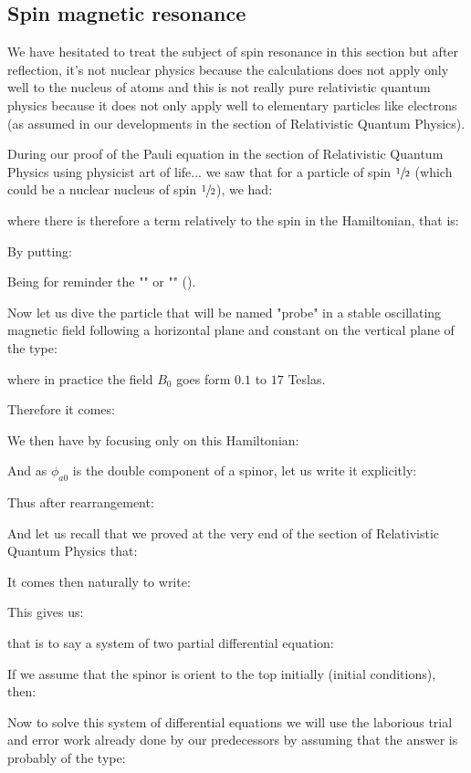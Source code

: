 	\pagebreak
	\subsection{Spin magnetic resonance}
	We have hesitated to treat the subject of spin resonance in this section but after reflection, it's not nuclear physics because the calculations does not apply only well to the nucleus of atoms and this is not really pure relativistic quantum physics because it does not only apply well to elementary particles like electrons (as assumed in our developments in the section  of Relativistic Quantum Physics).

	During our proof of the Pauli equation in the section of Relativistic Quantum Physics using physicist art of life... we saw that for a particle of spin $\sfrac{1}{2}$ (which could be a nuclear nucleus of spin $\sfrac{1}{2}$), we had:
	
	where there is therefore a term relatively to the spin in the Hamiltonian, that is:
	
	By putting:
	
	Being for reminder the "" or "" ().
	
	Now let us dive the particle that will be named "probe" in a stable oscillating magnetic field following a horizontal plane and constant on the vertical plane of the type:
	
	where in practice the field $B_0$ goes form $0.1$ to $17$ Teslas.

	Therefore it comes:
	
	We then have by focusing only on this Hamiltonian:
	
	And as $\phi_{a0}$ is the double component of a spinor, let us write it explicitly:
	
	Thus after rearrangement:
	
	And let us recall that we proved at the very end of the section of Relativistic Quantum Physics that:
	
	It comes then naturally to write:
	
	This gives us:
	
	that is to say a system of two partial differential equation:
	
	If we assume that the spinor is orient to the top initially (initial conditions), then:
	
	Now to solve this system of differential equations we will use the laborious trial and error work already done by our predecessors by assuming that the answer is probably of the type:
	
